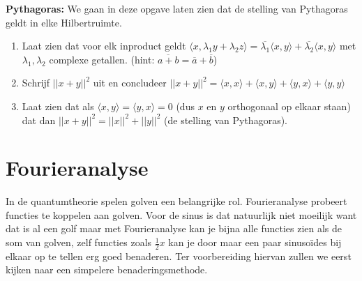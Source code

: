 \documentclass[../main.tex]{subfiles}
\begin{document}
\begin{opdracht}
\textbf{Pythagoras:} We gaan in deze opgave laten zien dat de stelling van Pythagoras geldt in elke Hilbertruimte.
\begin{enumerate}
\item Laat zien dat voor elk inproduct geldt $\langle x,\lambda_1y+\lambda_2z\rangle=\overline{\lambda_1}\langle x,y\rangle+\overline{\lambda_2}\langle x,y\rangle$ met $\lambda_1,\lambda_2$ complexe getallen. (hint: $\overline{a+b}=\overline{a}+\overline{b}$)
\item Schrijf $||x+y||^2$ uit en concludeer $||x+y||^2=\langle x,x\rangle+\langle x,y\rangle + \langle y,x\rangle+\langle y,y\rangle$
\item Laat zien dat als $\langle x,y\rangle=\langle y,x\rangle =0$ (dus $x$ en $y$ orthogonaal op elkaar staan) dat dan  $||x+y||^2=||x||^2+||y||^2$ (de stelling van Pythagoras).
\end{enumerate}
\end{opdracht}
\section{Fourieranalyse}

In de quantumtheorie spelen golven een belangrijke rol. Fourieranalyse probeert functies te koppelen aan golven. Voor de sinus is dat natuurlijk niet moeilijk want dat is al een golf maar met Fourieranalyse kan je bijna alle functies zien als de som van golven, zelf functies zoals $\frac{1}{2}x$ kan je door maar een paar sinuso\"ides bij elkaar op te tellen erg goed benaderen. Ter voorbereiding hiervan zullen we eerst kijken naar een simpelere benaderingsmethode.
\end{document}
